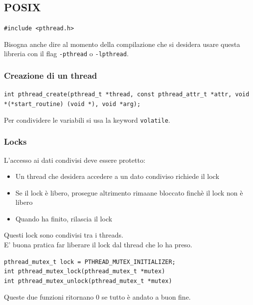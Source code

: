 \documentclass[12pt, a4paper]{report}
\begin{document}
            \subsection{POSIX}
                \begin{center}
                    \texttt{\#include <pthread.h>}
                \end{center}
                Bisogna anche dire al momento della compilazione che si desidera usare questa libreria con il flag \texttt{-pthread} o \texttt{-lpthread}.
                \subsubsection{Creazione di un thread}
                    \begin{center}
                        \texttt{int pthread\_create(pthread\_t *thread, const pthread\_attr\_t *attr, void *(*start\_routine) (void *), void *arg);}
                    \end{center}
                    Per condividere le variabili si usa la keyword \texttt{volatile}.
                \subsubsection{Locks}
                    L'accesso ai dati condivisi deve essere protetto:
                    \begin{itemize}
                        \item Un thread che desidera accedere a un dato condiviso richiede il lock
                        \item Se il lock è libero, prosegue altrimento rimaane bloccato finchè il lock non è libero
                        \item Quando ha finito, rilascia il lock
                    \end{itemize}
                    Questi lock sono condivisi tra i threads.\\
                    E' buona pratica far liberare il lock dal thread che lo ha preso.
                    \begin{center}
                        \texttt{pthread\_mutex\_t lock = PTHREAD\_MUTEX\_INITIALIZER;}\\
                        \texttt{int pthread\_mutex\_lock(pthread\_mutex\_t *mutex)}\\
                        \texttt{int pthread\_mutex\_unlock(pthread\_mutex\_t *mutex)}
                    \end{center}
                    Queste due funzioni ritornano 0 se tutto è andato a buon fine.
\end{document}
